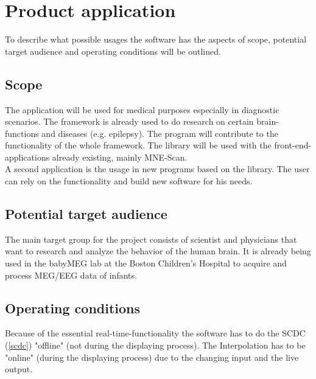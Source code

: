 \section{Product application}
To describe what possible usages the software has the aspects of scope, potential target audience and operating conditions will be outlined. 
\subsection{Scope}
The application will be used for medical purposes especially in diagnostic scenarios. The framework is already used to do research on certain brain-functions and diseases (e.g. epilepsy). The program  will contribute to the functionality of the whole framework. The library will be used with the front-end-applications already existing, mainly MNE-Scan.\\
A second application is the usage in new programs based on the library. The user can rely on the functionality and build new software for his needs.


\subsection{Potential target audience}
The main target group for the project consists of scientist and physicians that want to research and analyze the behavior of the human brain. It is already being used in the babyMEG lab at the Boston Children's Hospital to acquire and process MEG/EEG data of infants.

\subsection{Operating conditions}
Because of the essential real-time-functionality the software has to do the SCDC (\ref{scdc}) "offline" (not during the displaying process). The Interpolation has to be "online" (during the displaying process) due to the changing input and the live output.
